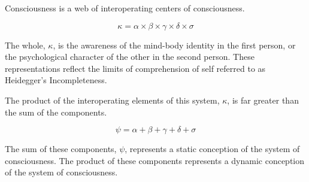 

Consciousness is a web of interoperating centers of consciousness.

$$\kappa = \alpha \times \beta \times \gamma \times \delta \times \sigma$$

The whole, $\kappa$, is the awareness of the mind-body identity in the
first person, or the psychological character of the other in the
second person.  These representations reflect the limits of
comprehension of self referred to as Heidegger’s Incompleteness.

The product of the interoperating elements of this system, $\kappa$,
is far greater than the sum of the components.

$$\psi = \alpha + \beta + \gamma + \delta + \sigma$$

The sum of these components, $\psi$, represents a static conception of
the system of consciousness.  The product of these components
represents a dynamic conception of the system of consciousness.

\bye
